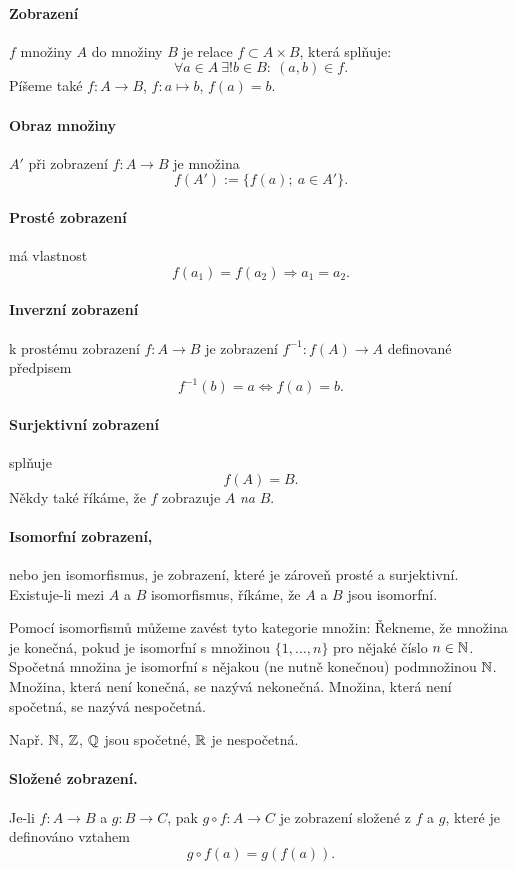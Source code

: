 \paragraph{Zobrazení} $f$ množiny $A$ do množiny $B$ je relace $f\subset A\times B$, která splňuje:
$$ \forall a\in A~\exists!b\in B:~(a,b)\in f. $$
Píšeme také $f:A\to B$, $f:a\mapsto b$, $f(a)=b$.

\paragraph{Obraz množiny} $A'$ při zobrazení $f:A\to B$ je množina
$$ f(A'):=\{f(a);~a\in A'\}. $$

\paragraph{Prosté zobrazení} má vlastnost
$$ f(a_1)=f(a_2) \Rightarrow a_1=a_2. $$

\paragraph{Inverzní zobrazení} k prostému zobrazení $f:A\to B$ je zobrazení $f^{-1}:f(A)\to A$ definované předpisem
$$ f^{-1}(b)=a \Leftrightarrow f(a)=b. $$

\paragraph{Surjektivní zobrazení} splňuje
$$ f(A)=B. $$
Někdy také říkáme, že $f$ zobrazuje $A$ \emph{na} $B$.

\paragraph{Isomorfní zobrazení,} nebo jen isomorfismus, je zobrazení, které je zároveň prosté a surjektivní.
Existuje-li mezi $A$ a $B$ isomorfismus, říkáme, že $A$ a $B$ jsou isomorfní.

Pomocí isomorfismů můžeme zavést tyto kategorie množin:
Řekneme, že množina je konečná, pokud je isomorfní s množinou $\{1,\ldots,n\}$ pro nějaké číslo $n\in\mathbb N$.
Spočetná množina je isomorfní s nějakou (ne nutně konečnou) podmnožinou $\mathbb N$.
Množina, která není konečná, se nazývá nekonečná.
Množina, která není spočetná, se nazývá nespočetná.

Např. $\mathbb N$, $\mathbb Z$, $\mathbb Q$ jsou spočetné, $\mathbb R$ je nespočetná.

\paragraph{Složené zobrazení.} Je-li $f:A\to B$ a $g:B\to C$, pak $g\circ f:A\to C$ je zobrazení složené z $f$ a $g$, které je definováno vztahem
$$ g\circ f(a) = g(f(a)). $$


